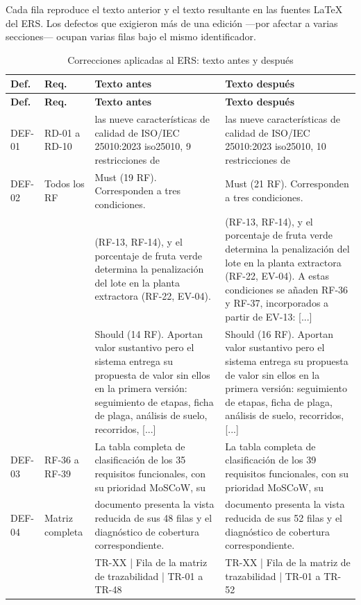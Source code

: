\documentclass[11pt,letterpaper]{article}
\begin{document}
Cada fila reproduce el texto anterior y el texto resultante en las fuentes \LaTeX{} del ERS. Los
defectos que exigieron más de una edición ---por afectar a varias secciones--- ocupan varias filas
bajo el mismo identificador.

{\footnotesize
\begin{longtable}{p{1.35cm} p{2.1cm} p{5.4cm} p{5.4cm}}
\caption{Correcciones aplicadas al ERS: texto antes y después}\\
\toprule
\textbf{Def.} & \textbf{Req.} & \textbf{Texto antes} & \textbf{Texto después}\\
\midrule
\endfirsthead
\toprule
\textbf{Def.} & \textbf{Req.} & \textbf{Texto antes} & \textbf{Texto después}\\
\midrule
\endhead
\bottomrule
\endfoot
DEF-01 & RD-01 a RD-10 & las nueve características de calidad de ISO/IEC 25010:2023 iso25010, 9 restricciones de & las nueve características de calidad de ISO/IEC 25010:2023 iso25010, 10 restricciones de\\
DEF-02 & Todos los RF & Must (19 RF). Corresponden a tres condiciones. & Must (21 RF). Corresponden a tres condiciones.\\
 &  & (RF-13, RF-14), y el porcentaje de fruta verde determina la penalización del lote en la planta extractora (RF-22, EV-04). & (RF-13, RF-14), y el porcentaje de fruta verde determina la penalización del lote en la planta extractora (RF-22, EV-04). A estas condiciones se añaden RF-36 y RF-37, incorporados a partir de EV-13: [...]\\
 &  & Should (14 RF). Aportan valor sustantivo pero el sistema entrega su propuesta de valor sin ellos en la primera versión: seguimiento de etapas, ficha de plaga, análisis de suelo, recorridos, [...] & Should (16 RF). Aportan valor sustantivo pero el sistema entrega su propuesta de valor sin ellos en la primera versión: seguimiento de etapas, ficha de plaga, análisis de suelo, recorridos, [...]\\
DEF-03 & RF-36 a RF-39 & La tabla completa de clasificación de los 35 requisitos funcionales, con su prioridad MoSCoW, su & La tabla completa de clasificación de los 39 requisitos funcionales, con su prioridad MoSCoW, su\\
DEF-04 & Matriz completa & documento presenta la vista reducida de sus 48 filas y el diagnóstico de cobertura correspondiente. & documento presenta la vista reducida de sus 52 filas y el diagnóstico de cobertura correspondiente.\\
 &  & TR-XX | Fila de la matriz de trazabilidad | TR-01 a TR-48 & TR-XX | Fila de la matriz de trazabilidad | TR-01 a TR-52\\

\end{longtable}}
\end{document}
